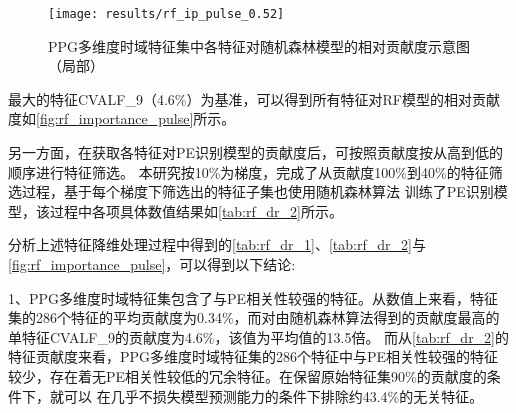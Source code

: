 \begin{figure}[htbp]
    \centering
    \texttt{[image: results/rf\_ip\_pulse\_0.52]}
    \caption[PPG多维度时域特征集中各特征对随机森林模型的相对贡献度示意图（局部）]{\label{fig:rf_importance_pulse}PPG多维度时域特征集中各特征对随机森林模型的相对贡献度示意图（局部）}
\end{figure}

\noindent
最大的特征CVALF\_9（4.6\%）为基准，可以得到所有特征对RF模型的相对贡献度如\autoref{fig:rf_importance_pulse}所示。

另一方面，在获取各特征对PE识别模型的贡献度后，可按照贡献度按从高到低的顺序进行特征筛选。
本研究按10\%为梯度，完成了从贡献度100\%到40\%的特征筛选过程，基于每个梯度下筛选出的特征子集也使用随机森林算法
训练了PE识别模型，该过程中各项具体数值结果如\autoref{tab:rf_dr_2}所示。

分析上述特征降维处理过程中得到的\autoref{tab:rf_dr_1}、\autoref{tab:rf_dr_2}与\autoref{fig:rf_importance_pulse}，可以得到以下结论:

1、PPG多维度时域特征集包含了与PE相关性较强的特征。从数值上来看，特征集的286个特征的平均贡献度为0.34\%，而对由随机森林算法得到的贡献度最高的单特征CVALF\_9的贡献度为4.6\%，该值为平均值的13.5倍。
而从\autoref{tab:rf_dr_2}的特征贡献度来看，PPG多维度时域特征集的286个特征中与PE相关性较强的特征较少，存在着无PE相关性较低的冗余特征。在保留原始特征集90\%的贡献度的条件下，就可以
在几乎不损失模型预测能力的条件下排除约43.4\%的无关特征。

